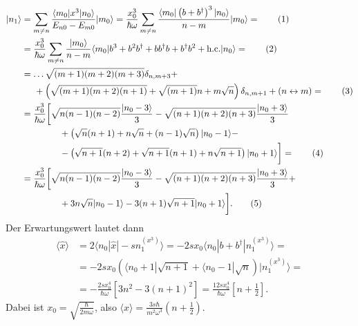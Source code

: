 \documentclass[english, parskip=full]{scrartcl}
\newcommand\numberthis{\addtocounter{equation}{1}\tag{\theequation}}
\renewcommand{\bra}{}
\renewcommand{\braket}{}
\newcommand{\kla}{}
\newcommand{\klam}{}
\newcommand{\tecxt}{}
\newcommand{\Bra}{}
\newcommand{\Ket}{}
\begin{document}
\begin{align*}
\Ket | n_1 \rangle &= \sum_{m\neq n} \frac{\braket\langle m_0 | x^3 | n_0 \rangle}{E_{n0} - E_{m0}} \Ket | m_0 \rangle = \frac{x_0^3}{\hbar\omega} \sum_{m\neq n} \frac{\braket\langle m_0 | \kla\left( b+b^\dagger \right)^3 | n_0 \rangle}{ n - m } \Ket | m_0 \rangle = \numberthis \\
&= \frac{x_0^3}{\hbar\omega} \sum_{m\neq n} \frac{\Ket | m_0 \rangle}{n-m} \braket\langle m_0 | b^3 + b^2b^\dagger + bb^\dagger b + b^\dagger b^2 + \tecxt\text{h.c.} | n_0 \rangle =  \numberthis \\
&= \dots \sqrt{(m+1)(m+2)(m+3)}\delta_{n,m+3} + \\
&\hspace{0.5cm} + \kla\left( \sqrt{(m+1)(m+2)(n+1)} + \sqrt{(m+1)}n + m\sqrt{n} \right) \delta_{n,m+1} + (n\leftrightarrow m) =  \numberthis \\
&= \frac{x_0^3}{\hbar\omega} \bigg[ \sqrt{n(n-1)(n-2)} \frac{\Ket | n_0-3 \rangle}{3} - \sqrt{(n+1)(n+2)(n+3)} \frac{\Ket | n_0+3 \rangle}{3}\\
&\hspace{1.5cm} + \kla\left( \sqrt{n}(n+1) + n\sqrt{n} + (n-1)\sqrt{n} \right) \Ket | n_0-1 \rangle - \\
&\hspace{1.5cm} - \kla\left( \sqrt{n+1}(n+2) + \sqrt{n+1}(n+1) + n\sqrt{n+1} \right) \Ket | n_0+1 \rangle \bigg] =  \numberthis \\
&= \frac{x_0^3}{\hbar\omega} \bigg[ \sqrt{n(n-1)(n-2)} \frac{\Ket | n_0-3 \rangle}{3} - \sqrt{(n+1)(n+2)(n+3)} \frac{\Ket | n_0+3 \rangle}{3} + \\
&\hspace{1.5cm} + 3n\sqrt{n} \Ket | n_0 - 1 \rangle - 3(n+1)\sqrt{n+1} \Ket | n_0 + 1 \rangle \bigg]. \numberthis 
\end{align*}
Der Erwartungswert lautet dann
\begin{align}
\bra\langle \hat{x} \rangle &= 2\braket\langle n_0 | \hat{x} | -sn_1^{(x^3)} \rangle = -2sx_0\braket\langle n_0 | b + b^\dagger | n_1^{(x^3)} \rangle = \\
&= -2sx_0 \kla\left( \Bra\langle n_0+1 |\sqrt{n+1} + \Bra\langle n_0-1 |\sqrt{n} \right) \Ket | n_1^{(x^3)} \rangle = \\
&= -\frac{2sx_0^4}{\hbar\omega} \klam\left[ 3n^2 - 3(n+1)^2 \right] = \frac{12sx_0^4}{\hbar\omega} \klam\left[ n + \frac{1}{2} \right].
\end{align}
Dabei ist $x_0=\sqrt{\frac{\hbar}{2m\omega}}$, also $\bra\langle \hat{x} \rangle = \frac{3s\hbar}{m^2\omega^3} \kla\left( n+\frac{1}{2} \right)$.
\end{document}

